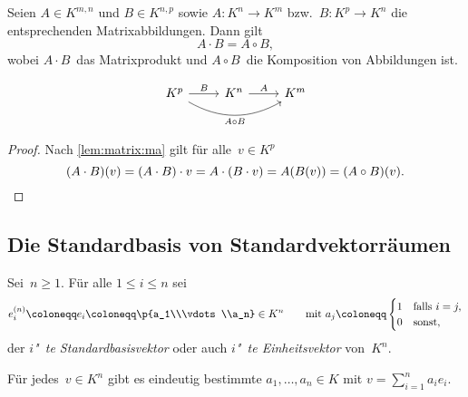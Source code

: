 \documentclass[a4paper]{article}
\begin{document}
\begin{theorem}
    Seien $A \in K^{m,n}$ und $B \in K^{n,p}$ sowie $A\colon K^n \to K^m$ bzw.\ $B\colon K^p \to K^n$ die entsprechenden Matrixabbildungen. Dann gilt
    \begin{equation*}
        A\cdot B = A\circ B,
    \end{equation*}
    wobei $A\cdot B$~das Matrixprodukt und $A\circ B$~die Komposition von Abbildungen ist.
\end{theorem}

\begin{equation*}
    \begin{tikzcd}
        K^p \ar[rr, bend right, "A\circ B"'] \ar[r, "B"] & K^n \ar[r, "A"] & K^m
    \end{tikzcd}
\end{equation*}

\begin{proof}
    Nach \cref{lem:matrix:ma} gilt für alle~$v \in K^p$
    \begin{equation*}
        (A\cdot B)(v) = (A\cdot B)\cdot v = A\cdot(B\cdot v) = A(B(v)) = (A\circ B)(v). \qedhere
    \end{equation*}
\end{proof}

\subsection{Die Standardbasis von Standardvektorräumen}

\begin{definition}[Standardbasisvektor]
    Sei~$n \geq 1$. Für alle $1 \leq i \leq n$ sei
    \begin{equation*}
        e^{(n)}_i \coloneqq e_i \coloneqq \p{a_1\\\vdots\\a_n} \in K^n \qquad\text{mit } a_j \coloneqq \begin{cases}
            1 & \text{falls } i = j, \\
            0 & \text{sonst},
        \end{cases}
    \end{equation*}
    der \emph{$i$"~te Standardbasisvektor} oder auch \emph{$i$"~te Einheitsvektor} von~$K^n$.
\end{definition}

\begin{lemma}\label{lem:canonicalbasis}
    Für jedes~$v \in K^n$ gibt es eindeutig bestimmte $a_1,\dots,a_n \in K$ mit $v = \sum_{i=1}^n a_ie_i$.
\end{lemma}
\end{document}
